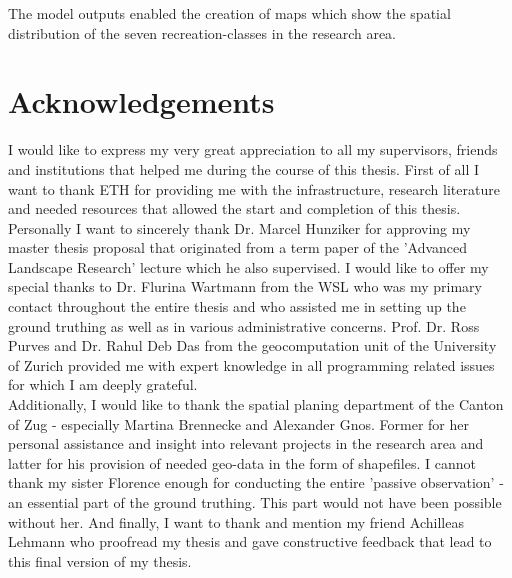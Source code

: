 The model outputs enabled the creation of maps which show the spatial distribution of the seven recreation-classes in the research area.

\cleardoublepage

\chapter*{Acknowledgements} \label{acknowledgements}
I would like to express my very great appreciation to all my supervisors, friends and institutions that helped me during the course of this thesis. First of all I want to thank ETH for providing me with the infrastructure, research literature and needed resources that allowed the start and completion of this thesis.\\

Personally I want to sincerely thank Dr. Marcel Hunziker for approving my master thesis proposal that originated from a term paper of the 'Advanced Landscape Research' lecture which he also supervised. I would like to offer my special thanks to Dr. Flurina Wartmann from the WSL who was my primary contact throughout the entire thesis and who assisted me in setting up the ground truthing as well as in various administrative concerns. Prof. Dr. Ross Purves and Dr. Rahul Deb Das from the geocomputation unit of the University of Zurich provided me with expert knowledge in all programming related issues for which I am deeply grateful.\\

Additionally, I would like to thank the spatial planing department of the Canton of Zug - especially Martina Brennecke and Alexander Gnos. Former for her personal assistance and insight into relevant projects in the research area and latter for his provision of needed geo-data in the form of shapefiles. I cannot thank my sister Florence enough for conducting the entire 'passive observation' - an essential part of the ground truthing. This part would not have been possible without her. And finally, I want to thank and mention my friend Achilleas Lehmann who proofread my thesis and gave constructive feedback that lead to this final version of my thesis.

\cleardoublepage

 \setcounter{tocdepth}{2}
 \tableofcontents
 \listoftables{}
 \listoffigures{}


